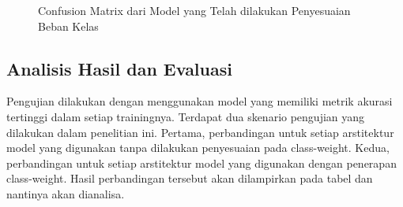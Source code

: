 \begin{figure}[hbtp]
    \qquad
    \qquad
    \caption{Confusion Matrix dari Model yang Telah dilakukan Penyesuaian Beban Kelas}%
    \label{fig:example}
\end{figure}

\newpage

\subsection{Analisis Hasil dan Evaluasi}
Pengujian dilakukan dengan menggunakan model yang memiliki metrik akurasi tertinggi dalam setiap trainingnya. Terdapat dua skenario pengujian yang dilakukan dalam penelitian ini. Pertama, perbandingan untuk setiap arstitektur model yang digunakan tanpa dilakukan penyesuaian pada class-weight. Kedua, perbandingan untuk setiap arstitektur model yang digunakan dengan penerapan class-weight. Hasil perbandingan tersebut akan dilampirkan pada tabel dan nantinya akan dianalisa.